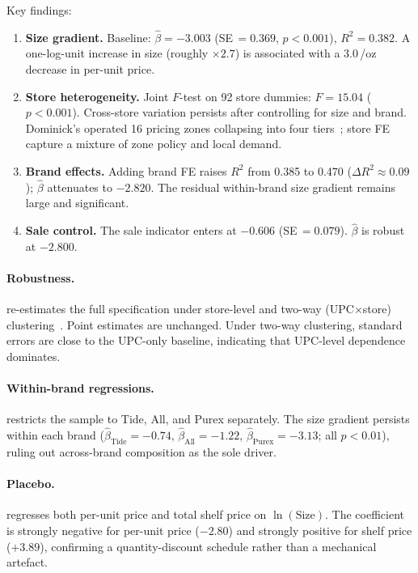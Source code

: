 \documentclass[11pt,a4paper]{article}
\theoremstyle{plain}
\theoremstyle{definition}
\theoremstyle{remark}
\begin{document}
\noindent
Key findings:
\begin{enumerate}[nosep,label=(\roman*)]
\item \textbf{Size gradient.}
  Baseline: $\hat\beta=-3.003$ (SE\,$=0.369$, $p<0.001$), $R^2=0.382$.
  A one-log-unit increase in size (roughly $\times 2.7$) is associated with a 3.0\,\textcent/oz decrease in per-unit price.
\item \textbf{Store heterogeneity.}
  Joint $F$-test on 92 store dummies: $F=15.04$ ($p<0.001$).
  Cross-store variation persists after controlling for size and brand.
  Dominick's operated 16 pricing zones collapsing into four tiers~\cite{DominicksManual}; store FE capture a mixture of zone policy and local demand.
\item \textbf{Brand effects.}
  Adding brand FE raises $R^2$ from 0.385 to 0.470 ($\Delta R^2\approx 0.09$); $\hat\beta$ attenuates to $-2.820$.
  The residual within-brand size gradient remains large and significant.
\item \textbf{Sale control.}
  The sale indicator enters at $-0.606$ (SE\,$=0.079$).
  $\hat\beta$ is robust at $-2.800$.
\end{enumerate}

\paragraph{Robustness.}
 re-estimates the full specification under store-level and two-way (UPC$\times$store) clustering~\cite{CGM2011}.
Point estimates are unchanged.
Under two-way clustering, standard errors are close to the UPC-only baseline, indicating that UPC-level dependence dominates.



\paragraph{Within-brand regressions.}
 restricts the sample to Tide, All, and Purex separately.
The size gradient persists within each brand ($\hat\beta_{\text{Tide}}=-0.74$, $\hat\beta_{\text{All}}=-1.22$, $\hat\beta_{\text{Purex}}=-3.13$; all $p<0.01$), ruling out across-brand composition as the sole driver.



\paragraph{Placebo.}
 regresses both per-unit price and total shelf price on $\ln(\text{Size})$.
The coefficient is strongly negative for per-unit price ($-2.80$) and strongly positive for shelf price ($+3.89$), confirming a quantity-discount schedule rather than a mechanical artefact.
\end{document}
